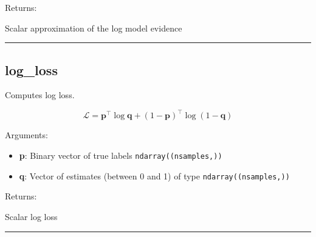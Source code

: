 Returns:

Scalar approximation of the log model evidence

\begin{center}\rule{0.5\linewidth}{\linethickness}\end{center}

\hypertarget{log_loss}{%
\subsection{log\_loss}\label{log_loss}}

\begin{Shaded}
\begin{Highlighting}[]
\end{Highlighting}
\end{Shaded}

Computes log loss.

\[
\mathcal L = \mathbf p^\top \log \mathbf q + (1-\mathbf p)^\top \log (1 - \mathbf q)
\]

Arguments:

\begin{itemize}
\tightlist
\item
  \textbf{p}: Binary vector of true labels \texttt{ndarray((nsamples,))}
\item
  \textbf{q}: Vector of estimates (between 0 and 1) of type
  \texttt{ndarray((nsamples,))}
\end{itemize}

Returns:

Scalar log loss

\begin{center}\rule{0.5\linewidth}{\linethickness}\end{center}
